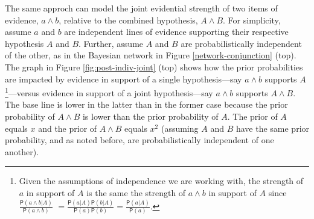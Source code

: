 \documentclass[10pt,dvipsnames,enabledeprecatedfontcommands]{scrartcl}
\newcommand{\pr}[1]{\mathsf{P}(#1)}
\begin{document}
The same approch can model the joint evidential strength of two items of
evidence, \(a \wedge b\), relative to the combined hypothesis,
\(A \wedge B\). For simplicity, assume \(a\) and \(b\) are independent
lines of evidence supporting their respective hypothesis \(A\) and
\(B\). Further, assume \(A\) and \(B\) are probabilistically independent
of the other, as in the Bayesian network in Figure
\ref{network-conjunction} (top). The graph in Figure
\ref{fig:post-indiv-joint} (top) shows how the prior probabilities are
impacted by evidence in support of a single hypothesis---say
\(a\wedge b\) supports
\(A\)\footnote{Given the assumptions of independence we are working with, the strength of $a$ in support of $A$ is the same the strength of 
$a\wedge b$ in support of $A$ since $\frac{\pr{a\wedge b \vert A}}{\pr{a \wedge b}}$ $=\frac{\pr{a \vert A}\pr{b \vert A}}{\pr{a}\pr{b}}=\frac{\pr{a \vert A}}{\pr{a}}$.}---versus
evidence in support of a joint hypothesis---say \(a\wedge b\) supports
\(A \wedge B\). The base line is lower in the latter than in the former
case because the prior probability of \(A \wedge B\) is lower than the
prior probability of \(A\). The prior of \(A\) equals \(x\) and the
prior of \(A\wedge B\) equals \(x^2\) (assuming \(A\) and \(B\) have the
same prior probability, and as noted before, are probabilistically
independent of one another).
\end{document}
